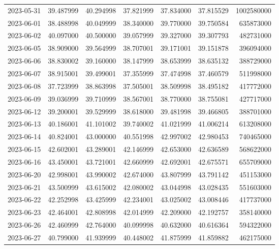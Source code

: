 \begin{tabular}{lrrrrrr}
2023-05-31 &   39.487999 &   40.294998 &   37.821999 &   37.834000 &   37.815529 &  1002580000 \\
2023-06-01 &   38.488998 &   40.049999 &   38.340000 &   39.770000 &   39.750584 &   635873000 \\
2023-06-02 &   40.097000 &   40.500000 &   39.057999 &   39.327000 &   39.307793 &   482731000 \\
2023-06-05 &   38.909000 &   39.564999 &   38.707001 &   39.171001 &   39.151878 &   396094000 \\
2023-06-06 &   38.830002 &   39.160000 &   38.147999 &   38.653999 &   38.635132 &   388729000 \\
2023-06-07 &   38.915001 &   39.499001 &   37.355999 &   37.474998 &   37.460579 &   511998000 \\
2023-06-08 &   37.723999 &   38.863998 &   37.505001 &   38.509998 &   38.495182 &   417772000 \\
2023-06-09 &   39.036999 &   39.710999 &   38.567001 &   38.770000 &   38.755081 &   427717000 \\
2023-06-12 &   39.200001 &   39.529999 &   38.618000 &   39.481998 &   39.466805 &   388701000 \\
2023-06-13 &   40.186001 &   41.101002 &   39.740002 &   41.021999 &   41.006214 &   613208000 \\
2023-06-14 &   40.824001 &   43.000000 &   40.551998 &   42.997002 &   42.980453 &   740465000 \\
2023-06-15 &   42.602001 &   43.289001 &   42.146999 &   42.653000 &   42.636589 &   568622000 \\
2023-06-16 &   43.450001 &   43.721001 &   42.660999 &   42.692001 &   42.675571 &   655709000 \\
2023-06-20 &   42.998001 &   43.990002 &   42.674000 &   43.807999 &   43.791142 &   451153000 \\
2023-06-21 &   43.500999 &   43.615002 &   42.080002 &   43.044998 &   43.028435 &   551603000 \\
2023-06-22 &   42.252998 &   43.425999 &   42.234001 &   43.025002 &   43.008446 &   417737000 \\
2023-06-23 &   42.464001 &   42.808998 &   42.014999 &   42.209000 &   42.192757 &   358140000 \\
2023-06-26 &   42.460999 &   42.764000 &   40.099998 &   40.632000 &   40.616364 &   594322000 \\
2023-06-27 &   40.799000 &   41.939999 &   40.448002 &   41.875999 &   41.859882 &   462175000 \\

\end{tabular}
